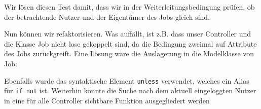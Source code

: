 \tddgreen
Wir lösen diesen Test damit, dass wir in der Weiterleitungsbedingung prüfen, ob der betrachtende Nutzer und der Eigentümer des Jobs gleich sind.

Nun können wir refaktorisieren. Was auffällt, ist z.B. dass unser Controller und die Klasse Job nicht lose gekoppelt sind, da die Bedingung zweimal auf Attribute des Jobs zurückgreift. Eine Lösung wäre die Auslagerung in die Modelklasse von Job:
\tddrefactor
%
%
\begin{ruby}[label=app/models/job.rb]
   
   
        
\end{ruby}
\begin{ruby}[label=app/controller/jobs\_controller.rb]
 
    \PY{o}{[}\PY{o}{]}
   \PY{o}{[}\PY{o}{]}
        
\end{ruby}

Ebenfalls wurde das syntaktische Element \texttt{unless} verwendet, welches ein Alias für \texttt{if not} ist.
Weiterhin könnte die Suche nach dem aktuell eingeloggten Nutzer in eine für alle Controller sichtbare Funktion ausgegliedert werden
\tddrefactor

